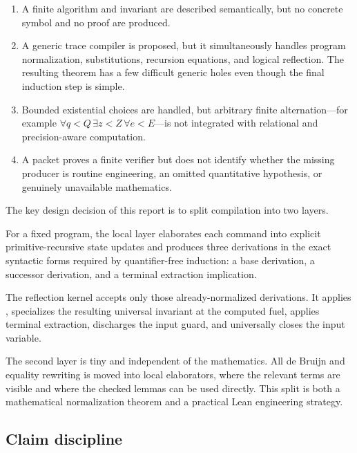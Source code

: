 \begin{enumerate}
\item A finite algorithm and invariant are described semantically, but no concrete  symbol and no  proof are produced.
\item A generic trace compiler is proposed, but it simultaneously handles program normalization, substitutions, recursion equations, and logical reflection.  The resulting theorem has a few difficult generic holes even though the final induction step is simple.
\item Bounded existential choices are handled, but arbitrary finite alternation---for example \(\forall q<Q\,\exists z<Z\,\forall e<E\)—is not integrated with relational and precision-aware computation.
\item A packet proves a finite verifier but does not identify whether the missing producer is routine engineering, an omitted quantitative hypothesis, or genuinely unavailable mathematics.
\end{enumerate}

The key design decision of this report is to split compilation into two layers.

\begin{definition}
For a fixed program, the local layer elaborates each command into explicit primitive-recursive state updates and produces three derivations in the exact syntactic forms required by quantifier-free induction: a base derivation, a successor derivation, and a terminal extraction implication.
\end{definition}

\begin{definition}
The reflection kernel accepts only those already-normalized derivations.  It applies , specializes the resulting universal invariant at the computed fuel, applies terminal extraction, discharges the input guard, and universally closes the input variable.
\end{definition}

The second layer is tiny and independent of the mathematics.  All de Bruijn and equality rewriting is moved into local elaborators, where the relevant terms are visible and where the checked  lemmas can be used directly.  This split is both a mathematical normalization theorem and a practical Lean engineering strategy.

\subsection{Claim discipline}

